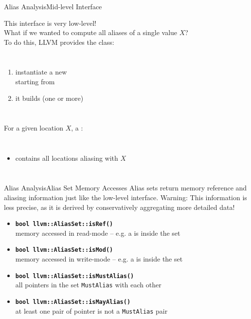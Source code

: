 \begin{frame}{Alias Analysis}{Mid-level Interface}
\begin{center}
This interface is very low-level!\\
\smallskip
What if we wanted to compute all aliases of a single value $X$?\\
\vfill
To do this, LLVM provides the  class:

\begin{columns}
\begin{enumerate}
\item instantiate a new \\
			starting from \footnotemark[1]
\item it builds (one or more) 
\end{enumerate}
\end{columns}

\vfill
For a given location $X$, a :

\begin{columns}
\begin{itemize}
\item contains all locations aliasing with $X$
\end{itemize}
\end{columns}
\vfill
\end{center}
\end{frame}


\begin{frame}{Alias Analysis}{Alias Set Memory Accesses}
Alias sets return memory reference and aliasing information just like
the low-level interface.
\vfill
\alert{Warning:} This information is \alert{less precise}, 
as it is derived by \alert{conservatively aggregating}
more detailed data!

\vfill
\begin{itemize}
\item \texttt{\textbf{bool llvm::AliasSet::isRef()}}\\
			memory accessed in read-mode -- e.g. a
       is inside the set
\item \texttt{\textbf{bool llvm::AliasSet::isMod()}}\\
			memory accessed in write-mode -- e.g. a
       is inside the set
\vfill
\item \texttt{\textbf{bool llvm::AliasSet::isMustAlias()}}\\
			all pointers in the set \texttt{MustAlias} with each other
\item \texttt{\textbf{bool llvm::AliasSet::isMayAlias()}}\\
			at least one pair of pointer is not a \texttt{MustAlias} pair
\vfill
\end{itemize}
\end{frame}


